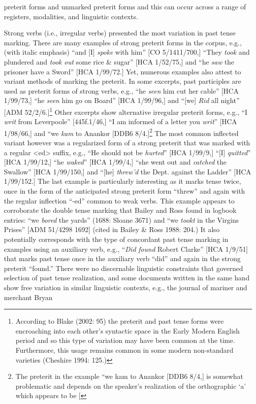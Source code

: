 \documentclass[12pt]{article}
\newenvironment{styleStandard}{\renewcommand\baselinestretch{1.0}\setlength\leftskip{0cm}\setlength\rightskip{0cm plus 1fil}\setlength\parindent{0cm}\setlength\parfillskip{0pt plus 1fil}\setlength\parskip{0in plus 1pt}\writerlistparindent\writerlistleftskip\leavevmode\normalfont\normalsize\writerlistlabel\ignorespaces}{\unskip\vspace{0in plus 1pt}\par}
\newcommand\writerlistleftskip{}
\newcommand\writerlistparindent{}
\newcommand\writerlistlabel{}
\begin{document}
\begin{styleStandard}
preterit forms and unmarked preterit forms and this can occur across a range of registers, modalities, and linguistic contexts. 
\end{styleStandard}


\begin{styleStandard}
Strong verbs (i.e., irregular verbs) presented the most variation in past tense marking. There are many examples of strong preterit forms in the corpus, e.g., (with italic emphasis) “and [I] \textit{spoke} with him” [CO 5/1411/700,] “They \textit{took} and plundered and \textit{took out} some rice \& sugar” [HCA 1/52/75,] and “he \textit{saw} the prisoner have a Sword” [HCA 1/99/72.] Yet, numerous examples also attest to variant methods of marking the preterit. In some excerpts, past participles are used as preterit forms of strong verbs, e.g., “he \textit{seen} him cut her cable” [HCA 1/99/73,] “he \textit{seen} him go on Board” [HCA 1/99/96,] and “[we]\textit{ Rid} all night” [ADM 52/2/6.]\footnote{ According to Blake (2002: 95) the preterit and past tense forms were encroaching into each other’s syntactic space in the Early Modern English period and so this type of variation may have been common at the time. Furthermore, this usage remains common in some modern non-standard varieties (Cheshire 1994: 125.)} Other excerpts show alternative irregular preterit forms, e.g., “I \textit{writ} from\textit{ }Leverpoole” [445f.1/46,] “I am informed of a letter you \textit{writ}” [HCA 1/98/66,] and “we \textit{kam} to Anankor{\textquotedbl} [DDB6 8/4.]\footnote{ The preterit in the example “we kam to Anankor{\textquotedbl} [DDB6 8/4,] is somewhat problematic and depends on the speaker’s realization of the orthographic ‘a’ which appears to be [\textcyrillic{ӕ] but could just have likely been realized as the diphthong [a\textlatin{[26A?]}] or another allophonic variant acceptable in contemporary usage. }} The most common inflected variant however was a regularized form of a strong preterit that was marked with a regular {\textless}ed{\textgreater} suffix, e.g., “He should not be \textit{hurted}” [HCA 1/99/9,] “[I] \textit{quitted}” [HCA 1/99/12,] “he \textit{waked}” [HCA 1/99/4,] “she went out and\textit{ catched} the Swallow” [HCA 1/99/150,] and “[he] \textit{threw’d} the Dept. against the Ladder” [HCA 1/99/152.] The last example is particularly interesting as it marks tense twice, once in the form of the anticipated strong preterit form “threw” and again with the regular inflection “-ed” common to weak verbs. This example appears to corroborate the double tense marking that Bailey and Ross found in logbook entries: “we \textit{bored} the yards” (1688: Sloane 3671) and “we \textit{tookt} in the Virgins Prises” [ADM 51/4298 1692] (cited in Bailey \& Ross 1988: 204.) It also potentially corresponds with the type of concordant past tense marking in examples using an auxiliary verb, e.g., “\textit{Did found} Robert Clarke” [HCA 1/9/51] that marks past tense once in the auxiliary verb “did” and again in the strong preterit “found.” There were no discernable linguistic constraints that governed selection of past tense realization, and some documents written in the same hand show free variation in similar linguistic contexts, e.g., the journal of mariner and merchant Bryan 
\end{styleStandard}
\end{document}
